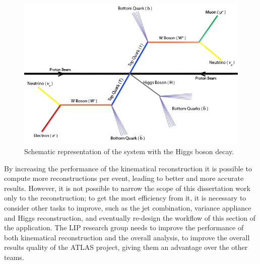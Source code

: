 \begin{figure}[!htp]
	\begin{center}
		\includegraphics[scale=0.5]{../../common/img/ttbar_higgs.png}
		\caption{Schematic representation of the \ttbar system with the Higgs boson decay.}
		\label{fig:ttbarhiggs}
	\end{center}
\end{figure}

By increasing the performance of the kinematical reconstruction it is possible to compute more reconstructions per event, leading to better and more accurate results. However, it is not possible to narrow the scope of this dissertation work only to the reconstruction; to get the most efficiency from it, it is necessary to consider other tasks to improve, such as the jet combination, variance appliance and Higgs reconstruction, and eventually re-design the workflow of this section of the application. The LIP research group needs to improve the performance of both kinematical reconstruction and the overall \tth analysis, to improve the overall results quality of the ATLAS project, giving them an advantage over the other teams.

\newpage
